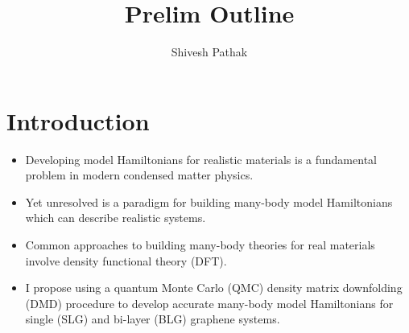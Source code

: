 \documentclass{article}
\title{Prelim Outline}
\author{Shivesh Pathak}
\begin{document}
\section{Introduction}
\begin{itemize}
\item Developing model Hamiltonians for realistic materials is a fundamental problem in modern condensed matter physics.

\item Yet unresolved is a paradigm for building many-body model Hamiltonians which can describe realistic systems.

\item Common approaches to building many-body theories for real materials involve density functional theory (DFT).

\item I propose using a quantum Monte Carlo (QMC) density matrix downfolding (DMD) procedure to develop accurate many-body model Hamiltonians for single (SLG) and bi-layer (BLG) graphene systems.
\end{itemize}
\end{document}
